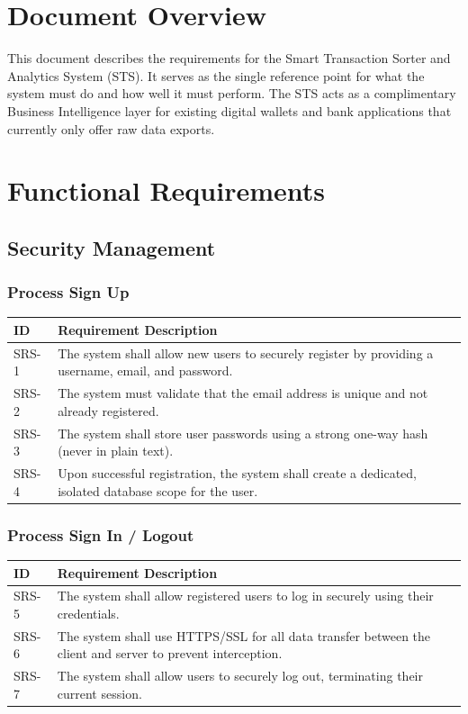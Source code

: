 \documentclass[11pt,a4paper]{report}
\begin{document}
\section{Document Overview}
This document describes the requirements for the Smart Transaction Sorter and Analytics System (STS). It serves as the single reference point for what the system must do and how well it must perform. The STS acts as a complimentary Business Intelligence layer for existing digital wallets and bank applications that currently only offer raw data exports.

\section{Functional Requirements}

\subsection{Security Management}

\subsubsection{Process Sign Up}
\begin{longtable}{|p{2.5cm}|p{12cm}|}
	\hline
	\textbf{ID} & \textbf{Requirement Description} \\
	\hline
	SRS-1 & The system shall allow new users to securely register by providing a username, email, and password. \\ \hline
	SRS-2 & The system must validate that the email address is unique and not already registered. \\ \hline
	SRS-3 & The system shall store user passwords using a strong one-way hash (never in plain text). \\ \hline
	SRS-4 & Upon successful registration, the system shall create a dedicated, isolated database scope for the user. \\ \hline
\end{longtable}

\subsubsection{Process Sign In / Logout}
\begin{longtable}{|p{2.5cm}|p{12cm}|}
	\hline
	\textbf{ID} & \textbf{Requirement Description} \\
	\hline
	SRS-5 & The system shall allow registered users to log in securely using their credentials. \\ \hline
	SRS-6 & The system shall use HTTPS/SSL for all data transfer between the client and server to prevent interception. \\ \hline
	SRS-7 & The system shall allow users to securely log out, terminating their current session. \\ \hline
\end{longtable}
\end{document}
